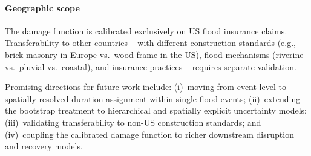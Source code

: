 \paragraph{Geographic scope} The damage function is calibrated exclusively on US flood insurance claims. Transferability to other countries -- with different construction standards (e.g., brick masonry in Europe vs.\ wood frame in the US), flood mechanisms (riverine vs.\ pluvial vs.\ coastal), and insurance practices -- requires separate validation.

Promising directions for future work include: (i)~moving from event-level to spatially resolved duration assignment within single flood events; (ii)~extending the bootstrap treatment to hierarchical and spatially explicit uncertainty models; (iii)~validating transferability to non-US construction standards; and (iv)~coupling the calibrated damage function to richer downstream disruption and recovery models.

